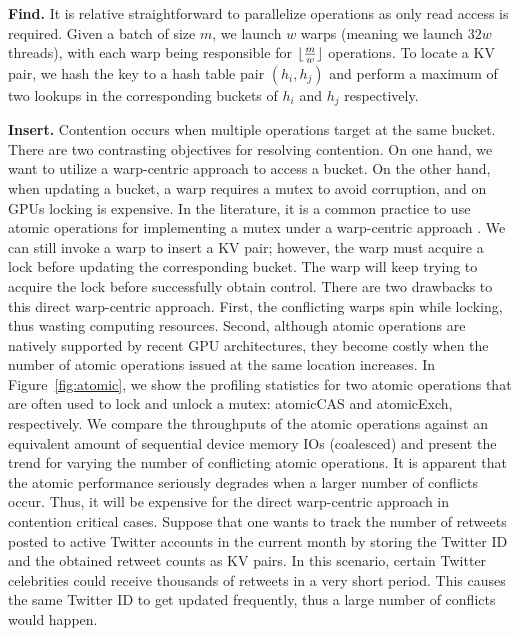 \vspace{1mm}\noindent\textbf{Find.} It is relative straightforward to parallelize  operations as only read access is required. 
Given a batch of size $m$, we launch $w$ warps (meaning we launch $32w$ threads), with each warp being responsible for $\lfloor\frac{m}{w}\rfloor$  operations. To locate a KV pair, we hash the key to a hash table pair $(h_i,h_j)$ and perform a maximum of two lookups in the corresponding buckets of $h_i$ and $h_j$ respectively. 




\vspace{1mm}\noindent\textbf{Insert.} Contention occurs when multiple  operations target at the same bucket. 
There are two contrasting objectives for resolving contention. On one hand, we want to utilize a warp-centric approach to access a bucket.
On the other hand, when updating a bucket, a warp requires a mutex to avoid corruption, and on GPUs locking is expensive.  
In the literature, it is a common practice to use atomic operations for implementing a mutex under a warp-centric approach \cite{zhang2015mega}. 
We can still invoke a warp to insert a KV pair; however, the warp must acquire a lock before updating the corresponding bucket. 
The warp will keep trying to acquire the lock before successfully obtain control. 
There are two drawbacks to this direct warp-centric approach. 
First, the conflicting warps spin while locking, thus wasting computing resources.
Second, although atomic operations are natively supported by recent GPU architectures, 
they become costly when the number of atomic operations issued at the same location increases. 
In Figure~\ref{fig:atomic}, we show the profiling statistics for two atomic operations that are often used to lock and unlock a mutex: atomicCAS and atomicExch, respectively. 
We compare the throughputs of the atomic operations against an equivalent amount of sequential device memory IOs (coalesced) and present the trend for varying the number of conflicting atomic operations. It is apparent that the atomic performance seriously degrades when a larger number of conflicts occur. 
Thus, it will be expensive for the direct warp-centric approach in contention critical cases. 
Suppose that one wants to track the number of retweets posted to active Twitter accounts in the current month by storing the Twitter ID and the obtained retweet counts as KV pairs. In this scenario, certain Twitter celebrities could receive thousands of retweets in a very short period. 
This causes the same Twitter ID to get updated frequently, thus a large number of conflicts would happen. 




